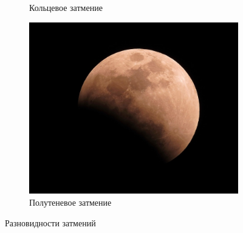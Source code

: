 \documentclass{article}
\begin{document}
\begin{figure}[p]
\begin{subfigure}[b]{0.45\textwidth}
    	\caption{Кольцевое затмение} 
    \end{subfigure} 
    \begin{subfigure}[b]{0.29\textwidth} 							\includegraphics[width = \textwidth]{img/2} 
    	\caption{Полутеневое затмение} 
    \end{subfigure} 
    \caption{Разновидности затмений} 
    \label{pic:a}
    \end{figure}
\end{document}
